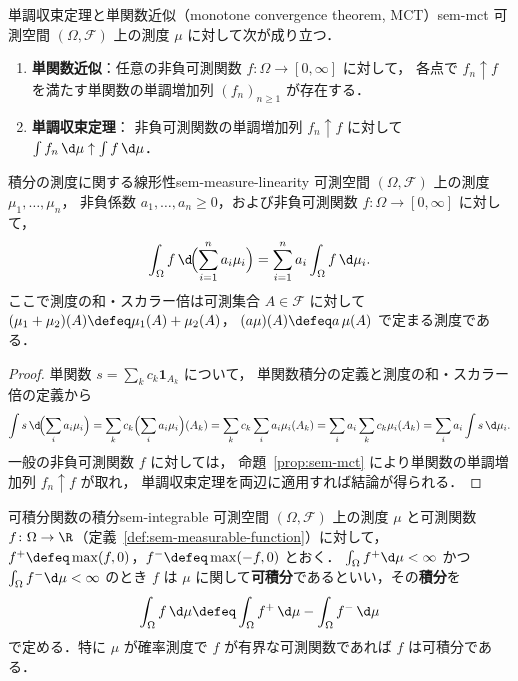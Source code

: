 \begin{proposition}{単調収束定理と単関数近似（monotone convergence theorem, MCT）}{sem-mct}
  可測空間 $(\Omega, \mathcal{F})$ 上の測度 $\mu$ に対して次が成り立つ．
  \begin{enumerate}
    \item[(i)] \textbf{単関数近似}：任意の非負可測関数
      $f \colon \Omega \to [0, \infty]$ に対して，
      各点で $f_n \uparrow f$ を満たす単関数の単調増加列 $(f_n)_{n \geq 1}$ が存在する．
    \item[(ii)] \textbf{単調収束定理}：
      非負可測関数の単調増加列 $f_n \uparrow f$ に対して
      $\int f_n \, \d\mu \uparrow \int f \, \d\mu$．
  \end{enumerate}
\end{proposition}

\begin{proposition}{積分の測度に関する線形性}{sem-measure-linearity}
  可測空間 $(\Omega, \mathcal{F})$ 上の測度 $\mu_1, \ldots, \mu_n$，
  非負係数 $a_1, \ldots, a_n \geq 0$，および非負可測関数
  $f \colon \Omega \to [0, \infty]$ に対して，
  \[
    \int_\Omega f \, \d\!\Bigl(\sum_{i=1}^{n} a_i \mu_i\Bigr)
    = \sum_{i=1}^{n} a_i \int_\Omega f \, \d\mu_i.
  \]
  ここで測度の和・スカラー倍は可測集合 $A \in \mathcal{F}$ に対して
  $(\mu_1 + \mu_2)(A) \defeq \mu_1(A) + \mu_2(A)$，
  $(a\mu)(A) \defeq a\, \mu(A)$ で定まる測度である．
\end{proposition}

\begin{proof}
  単関数 $s = \sum_{k} c_k \mathbf{1}_{A_k}$ について，
  単関数積分の定義と測度の和・スカラー倍の定義から
  \[
    \int s \, \d\!\Bigl(\sum_i a_i \mu_i\Bigr)
    = \sum_k c_k \Bigl(\sum_i a_i \mu_i\Bigr)(A_k)
    = \sum_k c_k \sum_i a_i \mu_i(A_k)
    = \sum_i a_i \sum_k c_k \mu_i(A_k)
    = \sum_i a_i \int s \, \d\mu_i.
  \]
  一般の非負可測関数 $f$ に対しては，
  命題~\ref{prop:sem-mct} により単関数の単調増加列 $f_n \uparrow f$ が取れ，
  単調収束定理を両辺に適用すれば結論が得られる．
\end{proof}

\begin{definition}{可積分関数の積分}{sem-integrable}
  可測空間 $(\Omega, \mathcal{F})$ 上の測度 $\mu$ と可測関数
  $f \colon \Omega \to \R$（定義~\ref{def:sem-measurable-function}）に対して，
  $f^+ \defeq \max(f, 0)$，$f^- \defeq \max(-f, 0)$ とおく．
  $\int_\Omega f^+ \d\mu < \infty$ かつ $\int_\Omega f^- \d\mu < \infty$ のとき
  $f$ は $\mu$ に関して\textbf{可積分}であるといい，その\textbf{積分}を
  \[
    \int_\Omega f \, \d\mu \defeq
    \int_\Omega f^+ \, \d\mu - \int_\Omega f^- \, \d\mu
  \]
  で定める．特に $\mu$ が確率測度で $f$ が有界な可測関数であれば
  $f$ は可積分である．
\end{definition}


